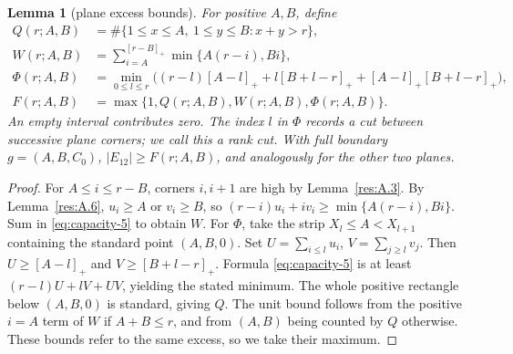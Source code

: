 \documentclass[11pt]{article}
\newtheorem{lemma}[theorem]{Lemma}
\theoremstyle{definition}
\theoremstyle{remark}
\theoremstyle{plain}
\begin{document}
\begin{lemma}[plane excess bounds]\label{res:A.8}
For positive $A,B$, define
\[
\begin{split}
 Q(r;A,B)&=\#\{1\le x\le A,\ 1\le y\le B:x+y>r\},\\
 W(r;A,B)&=\sum_{i=A}^{[r-B]_+}\min\{A(r-i),Bi\},\\
 \Phi(r;A,B)&=\min_{0\le l\le r}\bigl((r-l)[A-l]_+
             +l[B+l-r]_++[A-l]_+[B+l-r]_+\bigr),\\
 F(r;A,B)&=\max\{1,Q(r;A,B),W(r;A,B),\Phi(r;A,B)\}.
\end{split}
\]
An empty interval contributes zero. The index $l$ in $\Phi$ records
a cut between successive plane corners; we call this a rank cut.
With full boundary $g=(A,B,C_0)$,
$|E_{12}|\ge F(r;A,B)$, and analogously for the other two planes.
\end{lemma}
\begin{proof}
For $A\le i\le r-B$, corners $i,i+1$ are high by Lemma~\ref{res:A.3}. By Lemma~\ref{res:A.6},
$u_i\ge A$ or $v_i\ge B$, so
$(r-i)u_i+iv_i\ge\min\{A(r-i),Bi\}$. Sum in \eqref{eq:capacity-5} to obtain $W$.
For $\Phi$, take the strip $X_l\le A<X_{l+1}$ containing the standard
point $(A,B,0)$. Set $U=\sum_{i\le l}u_i$, $V=\sum_{j\ge l}v_j$.
Then $U\ge[A-l]_+$ and $V\ge[B+l-r]_+$. Formula \eqref{eq:capacity-5} is at least
$(r-l)U+lV+UV$, yielding the stated minimum.
The whole positive rectangle below $(A,B,0)$ is standard, giving $Q$.
The unit bound follows from the positive $i=A$ term of $W$ if
$A+B\le r$, and from $(A,B)$ being counted by $Q$ otherwise.
These bounds refer to the same excess, so we take their maximum.
\end{proof}
\end{document}
